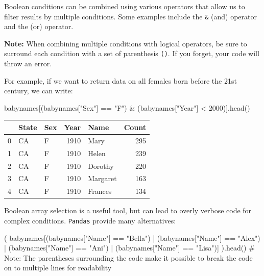 \documentclass[
  letterpaper,
  DIV=11,
  numbers=noendperiod]{scrreprt}
\newenvironment{Shaded}{\begin{snugshade}}{\end{snugshade}}
\newcommand{\CommentTok}[1]{\textcolor[rgb]{0.37,0.37,0.37}{#1}}
\newcommand{\DecValTok}[1]{\textcolor[rgb]{0.68,0.00,0.00}{#1}}
\newcommand{\NormalTok}[1]{\textcolor[rgb]{0.00,0.23,0.31}{#1}}
\newcommand{\OperatorTok}[1]{\textcolor[rgb]{0.37,0.37,0.37}{#1}}
\newcommand{\StringTok}[1]{\textcolor[rgb]{0.13,0.47,0.30}{#1}}
\begin{document}
Boolean conditions can be combined using various operators that allow us
to filter results by multiple conditions. Some examples include the
\texttt{\&} (and) operator and the \texttt{\textbar{}} (or) operator.

\textbf{Note:} When combining multiple conditions with logical
operators, be sure to surround each condition with a set of parenthesis
\texttt{()}. If you forget, your code will throw an error.

For example, if we want to return data on all females born before the
21st century, we can write:

\begin{Shaded}
\begin{Highlighting}[]
\NormalTok{babynames[(babynames[}\StringTok{"Sex"}\NormalTok{] }\OperatorTok{==} \StringTok{"F"}\NormalTok{) }\OperatorTok{\&}\NormalTok{ (babynames[}\StringTok{"Year"}\NormalTok{] }\OperatorTok{\textless{}} \DecValTok{2000}\NormalTok{)].head()}
\end{Highlighting}
\end{Shaded}

\begin{tabular}{lllrlr}
\toprule
{} & State & Sex &  Year &      Name &  Count \\
\midrule
0 &    CA &   F &  1910 &      Mary &    295 \\
1 &    CA &   F &  1910 &     Helen &    239 \\
2 &    CA &   F &  1910 &   Dorothy &    220 \\
3 &    CA &   F &  1910 &  Margaret &    163 \\
4 &    CA &   F &  1910 &   Frances &    134 \\
\bottomrule
\end{tabular}

Boolean array selection is a useful tool, but can lead to overly verbose
code for complex conditions. \texttt{Pandas} provide many alternatives:

\begin{Shaded}
\begin{Highlighting}[]
\NormalTok{(}
\NormalTok{    babynames[(babynames[}\StringTok{"Name"}\NormalTok{] }\OperatorTok{==} \StringTok{"Bella"}\NormalTok{) }\OperatorTok{|} 
\NormalTok{              (babynames[}\StringTok{"Name"}\NormalTok{] }\OperatorTok{==} \StringTok{"Alex"}\NormalTok{) }\OperatorTok{|}
\NormalTok{              (babynames[}\StringTok{"Name"}\NormalTok{] }\OperatorTok{==} \StringTok{"Ani"}\NormalTok{) }\OperatorTok{|}
\NormalTok{              (babynames[}\StringTok{"Name"}\NormalTok{] }\OperatorTok{==} \StringTok{"Lisa"}\NormalTok{)]}
\NormalTok{).head()}
\CommentTok{\# Note: The parentheses surrounding the code make it possible to break the code on to multiple lines for readability}
\end{Highlighting}
\end{Shaded}
\end{document}
